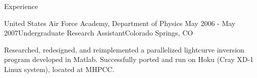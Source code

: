 \begin{rSection}{Experience}
\begin{rSubsection}{United States Air Force Academy, Department of Physics}
  {May 2006 - May 2007}{Undergraduate Research Assistant}{Colorado Springs, CO}
\item Researched, redesigned, and reimplemented a parallelized lightcurve inversion program developed in Matlab.
Successfully ported and run on Hoku (Cray XD-1 Linux system), located at MHPCC.
\end{rSubsection}


\end{rSection}
